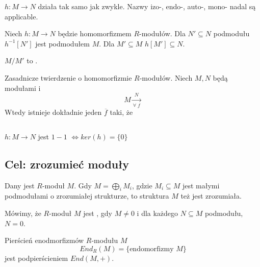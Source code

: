  $h:M\to N$ działa tak samo jak zwykle. Nazwy izo-, endo-, auto-, mono- nadal są applicable.

Niech $h:M\to N$ będzie homomorfizmem $R$-modułów. Dla $N'\subseteq N$ podmodułu $h^{-1}[N']$ jest podmodułem $M$. Dla $M'\subseteq M$ $h[M']\subseteq N$. 

$M/M'$ to .

\begin{theorem} Zasadnicze twierdzenie o homomorfizmie $R$-modułów. Niech $M,N$ będą modułami i
$$M\xrightarrow[\forall\;f]N$$
Wtedy istnieje dokładnie jeden $\overline f$ taki, że

\begin{center}
\end{center}

\end{theorem}

\begin{theorem}$ $

\begin{center}
\end{center}

\end{theorem}

$h:M\to N$ jest $1-1$ $\iff ker(h)=\{0\}$

\subsection{Cel: zrozumieć moduły}

\begin{bbox}
Dany jest $R$-moduł $M$. Gdy $M=\bigoplus_i M_i$, gdzie $M_i\subseteq M$ jest małymi podmodułami o zrozumiałej strukturze, to struktura $M$ też jest zrozumiała.
\end{bbox}

\begin{definition}
Mówimy, że $R$-moduł $M$ jest , gdy $M\neq 0$ i dla każdego $N\subseteq M$ podmodułu, $N=0$.

Pierścień enodmorfizmów $R$-modułu $M$
$$End_R(M)=\{\text{endomorfizmy }M\}$$
jest podpierścieniem $End(M, +)$.
\end{definition}

